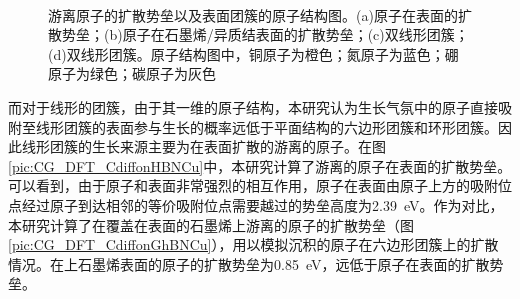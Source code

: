    \begin{figure}[htb]
        \\[-1ex]
        \caption{游离原子的扩散势垒以及表面团簇的原子结构图。(a)原子在表面的扩散势垒；(b)原子在石墨烯/异质结表面的扩散势垒；(c)双线形团簇；(d)双线形团簇。原子结构图中，铜原子为橙色；氮原子为蓝色；硼原子为绿色；碳原子为灰色}
        \label{}
    \end{figure}

    而对于线形的团簇，由于其一维的原子结构，本研究认为生长气氛中的原子直接吸附至线形团簇的表面参与生长的概率远低于平面结构的六边形团簇和环形团簇。因此线形团簇的生长来源主要为在表面扩散的游离的原子。在图\ref{pic:CG_DFT_CdiffonHBNCu}中，本研究计算了游离的原子在表面的扩散势垒。可以看到，由于原子和表面非常强烈的相互作用，原子在表面由原子上方的吸附位点经过原子到达相邻的等价吸附位点需要越过的势垒高度为\SI{2.39}{\electronvolt}。作为对比，本研究计算了在覆盖在表面的石墨烯上游离的原子的扩散势垒（图\ref{pic:CG_DFT_CdiffonGhBNCu}），用以模拟沉积的原子在六边形团簇上的扩散情况。在上石墨烯表面的原子的扩散势垒为\SI{0.85}{\electronvolt}，远低于原子在表面的扩散势垒。


